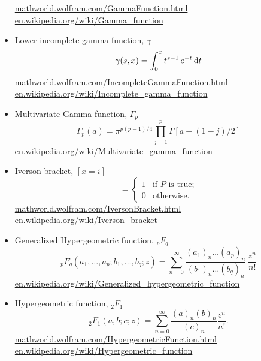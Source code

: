 \begin{itemize}
\url{mathworld.wolfram.com/GammaFunction.html}\\
\url{en.wikipedia.org/wiki/Gamma_function}
\item Lower incomplete gamma function, $\gamma$\\
\begin{equation*}
  \gamma(s,x) = \int_0^x t^{s-1}\,e^{-t}\,{\rm d}t
\end{equation*}
\url{mathworld.wolfram.com/IncompleteGammaFunction.html}\\
\url{en.wikipedia.org/wiki/Incomplete_gamma_function}
\item Multivariate Gamma function,	$\Gamma_p$\\
\begin{equation*}
\Gamma_p(a)= \pi^{p(p-1)/4}\prod_{j=1}^p \Gamma\left[ a+(1-j)/2\right]
\end{equation*}
\url{en.wikipedia.org/wiki/Multivariate_gamma_function}
\item Iverson bracket, $[x=i]$\\ 
\begin{equation*}
[P] = \begin{cases} 1 & \text{if } P \text{ is true;} \\ 0 & \text{otherwise.} \end{cases}
\end{equation*}
\url{mathworld.wolfram.com/IversonBracket.html}\\
\url{en.wikipedia.org/wiki/Iverson_bracket}
\item Generalized Hypergeometric function, ${}_pF_q$\\
\begin{equation*}
{}_pF_q(a_1,\ldots,a_p;b_1,\ldots,b_q;z) = \sum_{n=0}^\infty \frac{(a_1)_n\dots(a_p)_n}{(b_1)_n\dots(b_q)_n} \, \frac {z^n} {n!}
\end{equation*}
\url{en.wikipedia.org/wiki/Generalized_hypergeometric_function}
\item Hypergeometric function, $_2F_1$\\
\begin{equation*}
{}_2F_1(a,b;c;z) = \sum_{n=0}^\infty \frac{(a)_n (b)_n}{(c)_n} \frac{z^n}{n!}.
\end{equation*}
\url{mathworld.wolfram.com/HypergeometricFunction.html}\\
\url{en.wikipedia.org/wiki/Hypergeometric_function}
\end{itemize}


